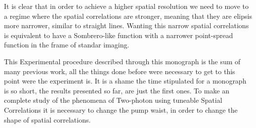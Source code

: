 It is clear that in order to achieve a higher spatial resolution we need to move to a regime where the spatial correlations are
stronger, meaning that they are elipsis more narrower, similar to straight lines. Wanting this narrow spatial correlations is equivalent 
to have a Sombrero-like function with a narrower point-spread function in the frame of standar imaging.

This Experimental procedure described through this monograph is the sum of many previous work, all the things done before
were necessary to get to this point were the experiment is. It is a shame the time stipulated for a monograph is so short,
the results presented so far, are just the first ones. To make an complete study of the 
phenomena of Two-photon using tuneable Spatial Correlations it is necessary to change the pump waist, in order to change the shape of 
spatial correlations.


